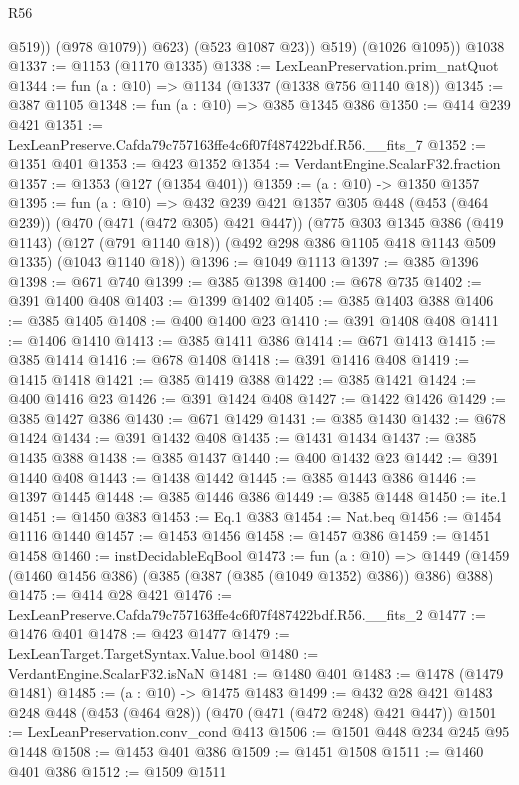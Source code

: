 \begin{lexlean}{R56}
\begin{coremodule}
                  @519))
              (@978 @1079))
            @623)
          (@523 @1087 @23))
        @519)
      (@1026 @1095))
    @1038
@1337 := @1153 (@1170 @1335)
@1338 := LexLeanPreservation.prim_natQuot
@1344 := fun (a : @10) => @1134 (@1337 (@1338 @756 @1140 @18))
@1345 := @387 @1105
@1348 := fun (a : @10) => @385 @1345 @386
@1350 := @414 @239 @421
@1351 := LexLeanPreserve.Cafda79c757163ffe4c6f07f487422bdf.R56.__fits_7
@1352 := @1351 @401
@1353 := @423 @1352
@1354 := VerdantEngine.ScalarF32.fraction
@1357 := @1353 (@127 (@1354 @401))
@1359 := (a : @10) -> @1350 @1357
@1395 := fun (a : @10) =>
  @432
    @239
    @421
    @1357
    @305
    @448
    (@453 (@464 @239))
    (@470 (@471 (@472 @305) @421 @447))
    (@775
      @303
      @1345
      @386
      (@419 @1143)
      (@127 (@791 @1140 @18))
      (@492 @298 @386 @1105 @418 @1143 @509 @1335)
      (@1043 @1140 @18))
@1396 := @1049 @1113
@1397 := @385 @1396
@1398 := @671 @740
@1399 := @385 @1398
@1400 := @678 @735
@1402 := @391 @1400 @408
@1403 := @1399 @1402
@1405 := @385 @1403 @388
@1406 := @385 @1405
@1408 := @400 @1400 @23
@1410 := @391 @1408 @408
@1411 := @1406 @1410
@1413 := @385 @1411 @386
@1414 := @671 @1413
@1415 := @385 @1414
@1416 := @678 @1408
@1418 := @391 @1416 @408
@1419 := @1415 @1418
@1421 := @385 @1419 @388
@1422 := @385 @1421
@1424 := @400 @1416 @23
@1426 := @391 @1424 @408
@1427 := @1422 @1426
@1429 := @385 @1427 @386
@1430 := @671 @1429
@1431 := @385 @1430
@1432 := @678 @1424
@1434 := @391 @1432 @408
@1435 := @1431 @1434
@1437 := @385 @1435 @388
@1438 := @385 @1437
@1440 := @400 @1432 @23
@1442 := @391 @1440 @408
@1443 := @1438 @1442
@1445 := @385 @1443 @386
@1446 := @1397 @1445
@1448 := @385 @1446 @386
@1449 := @385 @1448
@1450 := ite.{1}
@1451 := @1450 @383
@1453 := Eq.{1} @383
@1454 := Nat.beq
@1456 := @1454 @1116 @1440
@1457 := @1453 @1456
@1458 := @1457 @386
@1459 := @1451 @1458
@1460 := instDecidableEqBool
@1473 := fun (a : @10) =>
  @1449 (@1459 (@1460 @1456 @386) (@385 (@387 (@385 (@1049 @1352) @386)) @386) @388)
@1475 := @414 @28 @421
@1476 := LexLeanPreserve.Cafda79c757163ffe4c6f07f487422bdf.R56.__fits_2
@1477 := @1476 @401
@1478 := @423 @1477
@1479 := LexLeanTarget.TargetSyntax.Value.bool
@1480 := VerdantEngine.ScalarF32.isNaN
@1481 := @1480 @401
@1483 := @1478 (@1479 @1481)
@1485 := (a : @10) -> @1475 @1483
@1499 := @432 @28 @421 @1483 @248 @448 (@453 (@464 @28)) (@470 (@471 (@472 @248) @421 @447))
@1501 := LexLeanPreservation.conv_cond @413
@1506 := @1501 @448 @234 @245 @95 @1448
@1508 := @1453 @401 @386
@1509 := @1451 @1508
@1511 := @1460 @401 @386
@1512 := @1509 @1511

\end{coremodule}
\end{lexlean}
